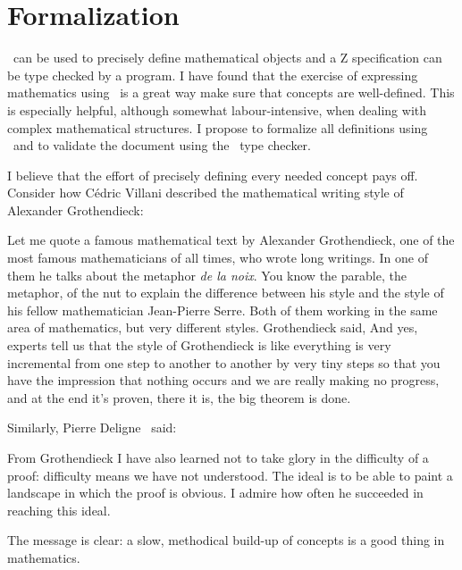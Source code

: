 \documentclass{amsart}
\begin{document}
\section{Formalization}

\ZN\  can be used to precisely define mathematical objects and a Z specification can be type checked by a program.
I have found that the exercise of expressing mathematics using \ZN\  is a great way make sure that concepts are well-defined.
This is especially helpful, although somewhat labour-intensive, when dealing with complex mathematical structures.
I propose to formalize all definitions using \ZN\  and to validate
the document using the \fuzz\ type checker.

I believe that the effort of precisely defining every needed concept pays off. 
Consider how C\'{e}dric Villani \cite{villani-hbm} described the mathematical writing style of Alexander Grothendieck:
\begin{displayquote}
Let me quote a famous mathematical text by Alexander Grothendieck, 
one of the most famous mathematicians of all times, who wrote long writings.
In one of them he talks about the metaphor \textit{de la noix}.
You know the parable, the metaphor, of the nut
to explain the difference between his style and 
the style of his fellow mathematician Jean-Pierre Serre.
Both of them working in the same area of mathematics, but very different styles. 
Grothendieck said, 
And yes, experts tell us that the style of Grothendieck is like everything is very
incremental from one step to another to
another by very tiny steps so that you
have the impression that nothing occurs
and we are really making no progress, and
at the end it's proven, there it is, the big theorem is done.
\end{displayquote}
Similarly, Pierre Deligne~\cite{artin-ag1} said:
\begin{displayquote}
From Grothendieck I have also learned not to take glory in the difficulty of a proof: 
difficulty means we have not understood.
The ideal is to be able to paint a landscape in which the proof is obvious.
I admire how often he succeeded in reaching this ideal.
\end{displayquote}
The message is clear: a slow, methodical build-up of concepts is a good thing in mathematics.
\end{document}
